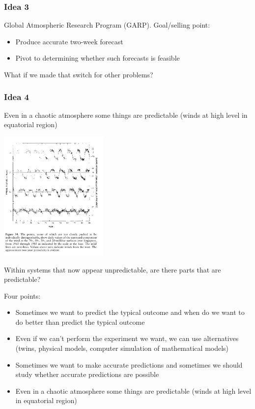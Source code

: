 \documentclass[aspectratio=169]{beamer}
\begin{document}
\begin{frame}
\frametitle{Idea 3}

Global Atmospheric Research Program (GARP). Goal/selling point:
\begin{itemize}
\item Produce accurate two-week forecast
\pause
\item Pivot to determining whether such forecasts is feasible
\end{itemize}
\pause
\vfill
What if we made that switch for other problems?

\end{frame}
\begin{frame}
\frametitle{Idea 4}

Even in a chaotic atmosphere some things are predictable (winds at high level in equatorial region)

\begin{center}
\includegraphics[width = 0.4\textwidth]{figures/lorenz_essence_1993_fig34_wcaption}
\end{center}

\vfill
Within systems that now appear unpredictable, are there parts that are predictable?

\end{frame}
\begin{frame}

Four points:
\begin{itemize}
\item Sometimes we want to predict the typical outcome and when do we want to do better than predict the typical outcome
\pause
\item Even if we can't perform the experiment we want, we can use alternatives (twins, physical models, computer simulation of mathematical models)
\pause
\item Sometimes we want to make accurate predictions and sometimes we should study whether accurate predictions are possible
\pause
\item Even in a chaotic atmosphere some things are predictable (winds at high level in equatorial region)
\end{itemize}

\end{frame}
\end{document}
